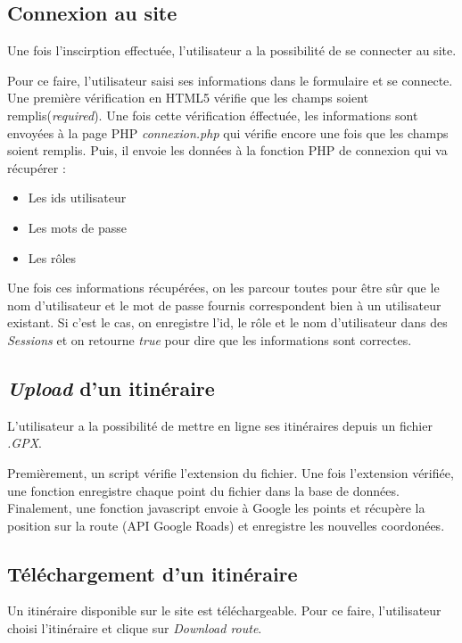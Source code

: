 \documentclass[a4paper]{article}
\newcommand{\bdd}{base de données}
\newcommand{\diag}[1]{}
\begin{document}
\subsection{Connexion au site}
Une fois l'inscirption effectuée, l'utilisateur a la possibilité de se connecter au site.

Pour ce faire, l'utilisateur saisi ses informations dans le formulaire et se connecte.
Une première vérification en HTML5 vérifie que les champs soient remplis(\emph{required}).
Une fois cette vérification éffectuée, les informations sont envoyées à la page PHP \emph{connexion.php} qui vérifie encore une fois que les champs soient remplis. Puis, il envoie les données à la fonction PHP de connexion qui va récupérer :
\begin{itemize}
	\item Les ids utilisateur
	\item Les mots de passe
	\item Les rôles
\end{itemize}

Une fois ces informations récupérées, on les parcour toutes pour être sûr que le nom d'utilisateur et le mot de passe fournis correspondent bien à un utilisateur existant.
Si c'est le cas, on enregistre l'id, le rôle et le nom d'utilisateur dans des \emph{Sessions} et on retourne \emph{true} pour dire que les informations sont correctes.

\begin{center}
	\diag{Connexion}
\end{center}

\subsection{\emph{Upload} d'un itinéraire}
L'utilisateur a la possibilité de mettre en ligne ses itinéraires depuis un fichier \emph{.GPX}.

Premièrement, un script vérifie l'extension du fichier. Une fois l'extension vérifiée, une fonction enregistre chaque point du fichier dans la \bdd. Finalement, une fonction javascript envoie à Google les points et récupère la position sur la route (API Google Roads) et enregistre les nouvelles coordonées.

\begin{center}
	\diag{Gpx2Sql}
\end{center}


\subsection{Téléchargement d'un itinéraire}
Un itinéraire disponible sur le site est téléchargeable.
Pour ce faire, l'utilisateur choisi l'itinéraire et clique sur \emph{Download route}.
\end{document}
